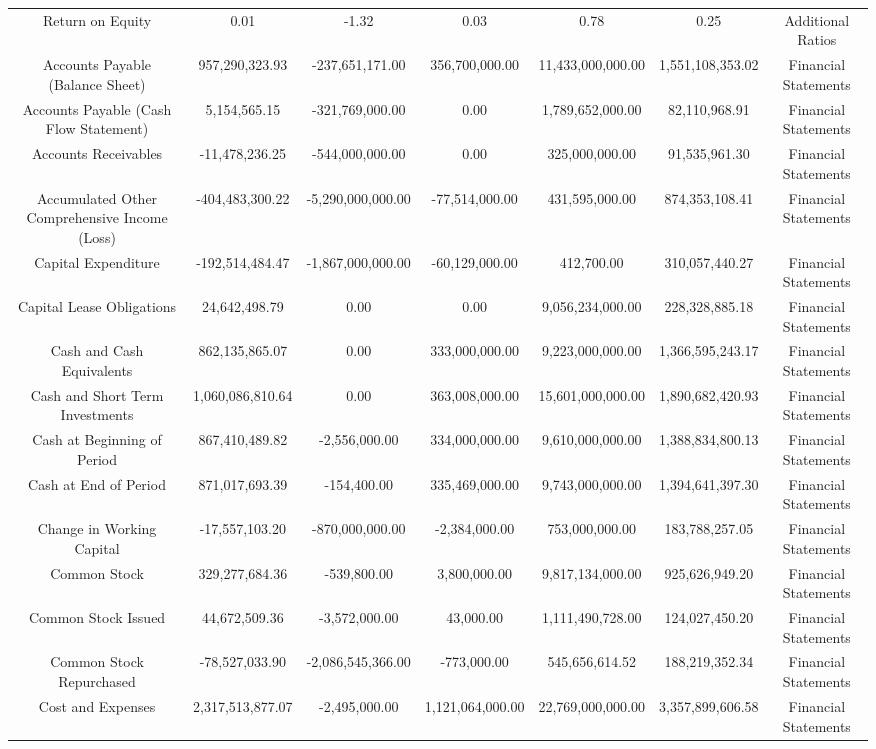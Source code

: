 \begin{longtable}{ccccccc}
Return on Equity & 0.01 & -1.32 & 0.03 & 0.78 & 0.25 & Additional Ratios \\
Accounts Payable (Balance Sheet) & 957,290,323.93 & -237,651,171.00 & 356,700,000.00 & 11,433,000,000.00 & 1,551,108,353.02 & Financial Statements \\
Accounts Payable (Cash Flow Statement) & 5,154,565.15 & -321,769,000.00 & 0.00 & 1,789,652,000.00 & 82,110,968.91 & Financial Statements \\
Accounts Receivables & -11,478,236.25 & -544,000,000.00 & 0.00 & 325,000,000.00 & 91,535,961.30 & Financial Statements \\
Accumulated Other Comprehensive Income (Loss) & -404,483,300.22 & -5,290,000,000.00 & -77,514,000.00 & 431,595,000.00 & 874,353,108.41 & Financial Statements \\
Capital Expenditure & -192,514,484.47 & -1,867,000,000.00 & -60,129,000.00 & 412,700.00 & 310,057,440.27 & Financial Statements \\
Capital Lease Obligations & 24,642,498.79 & 0.00 & 0.00 & 9,056,234,000.00 & 228,328,885.18 & Financial Statements \\
Cash and Cash Equivalents & 862,135,865.07 & 0.00 & 333,000,000.00 & 9,223,000,000.00 & 1,366,595,243.17 & Financial Statements \\
Cash and Short Term Investments & 1,060,086,810.64 & 0.00 & 363,008,000.00 & 15,601,000,000.00 & 1,890,682,420.93 & Financial Statements \\
Cash at Beginning of Period & 867,410,489.82 & -2,556,000.00 & 334,000,000.00 & 9,610,000,000.00 & 1,388,834,800.13 & Financial Statements \\
Cash at End of Period & 871,017,693.39 & -154,400.00 & 335,469,000.00 & 9,743,000,000.00 & 1,394,641,397.30 & Financial Statements \\
Change in Working Capital & -17,557,103.20 & -870,000,000.00 & -2,384,000.00 & 753,000,000.00 & 183,788,257.05 & Financial Statements \\
Common Stock & 329,277,684.36 & -539,800.00 & 3,800,000.00 & 9,817,134,000.00 & 925,626,949.20 & Financial Statements \\
Common Stock Issued & 44,672,509.36 & -3,572,000.00 & 43,000.00 & 1,111,490,728.00 & 124,027,450.20 & Financial Statements \\
Common Stock Repurchased & -78,527,033.90 & -2,086,545,366.00 & -773,000.00 & 545,656,614.52 & 188,219,352.34 & Financial Statements \\
Cost and Expenses & 2,317,513,877.07 & -2,495,000.00 & 1,121,064,000.00 & 22,769,000,000.00 & 3,357,899,606.58 & Financial Statements \\

\end{longtable}
